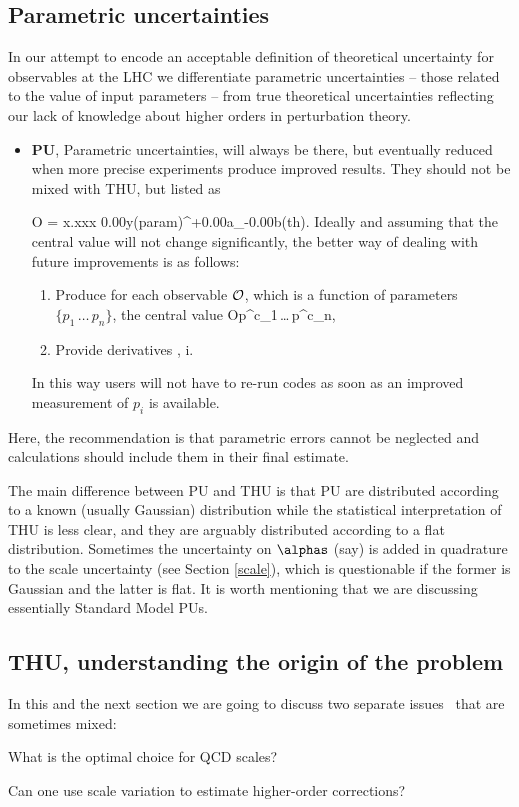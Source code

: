 \subsection{Parametric uncertainties}
In our attempt to encode an acceptable definition of theoretical uncertainty  
for observables at the LHC we differentiate parametric uncertainties -- those 
related to the value of input parameters -- from true theoretical uncertainties 
reflecting our lack of knowledge about higher orders in perturbation theory.
\begin{itemize}
\item{{\bf PU}}, Parametric uncertainties, will always be there, but 
eventually reduced when
more precise experiments produce improved results. They should not be mixed
with THU, but listed as

\bq
{\cal O} = x.xxx \pm 0.00y\;\hbox{(param)}\;{}^{+0.00a}_{-0.00b}\;\hbox{(th)}.
\eq
Ideally and assuming that the central value will not change significantly, the
better way of dealing with future improvements is as follows:
\begin{enumerate}
\item Produce for each observable ${\cal O}$, which is a
function of parameters $\{p_1\,\dots\,p_n\}$, the central value
\bq
{\cal O}\lpar p^c_1\,\dots\,p^c_n\rpar,
\eq
\item Provide derivatives
\bq
{}, \qquad \forall i.
\eq
\end{enumerate}
In this way users will not have to re-run codes as soon as an improved 
measurement of $p_i$ is available.
\end{itemize}
Here, the recommendation is that parametric errors cannot be neglected and 
calculations should include them in their final estimate. 

The main difference between PU and THU is that PU are distributed according to a 
known (usually Gaussian) distribution while the statistical interpretation of THU is
less clear, and they are arguably distributed according to a flat distribution. 
Sometimes the uncertainty on $\alphas$ (say) is added
in quadrature to the scale uncertainty (see Section \ref{scale}), which is  
questionable if the former is Gaussian and the latter is flat. 
It is worth mentioning that we are discussing essentially Standard Model PUs.
\subsection{THU, understanding the origin of the problem}
\label{orprob}
In this and the next section we are going to discuss two separate 
issues~\cite{Collins:1990bu} that are sometimes mixed:
\bei
\item What is the optimal choice for QCD scales?
\item Can one use scale variation to estimate higher-order corrections?
\eei

